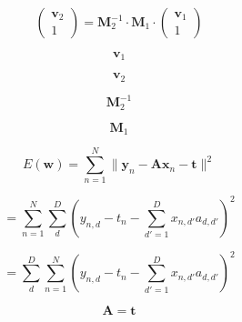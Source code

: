 \documentclass[10pt,twoside]{book}
\newcommand{\fat}[1]{\mathbf{#1}} %
\begin{document}

$$
\left(
\begin{array}{c}
\fat{v}_{2} \\
1 
\end{array}
\right)
=
\fat{M}_{2}^{-1}
\cdot
\fat{M}_{1}
\cdot
\left(
\begin{array}{c}
\fat{v}_{1} \\
1 
\end{array}
\right)
$$

$$
\fat{v}_1
$$

$$
\fat{v}_2
$$

$$
\fat{M}_{2}^{-1}
$$

$$
\fat{M}_{1}
$$


$$
E(\fat{w}) 
=
\sum_{n=1}^N \| \fat{y}_n - \fat{A} \fat{x}_n - \fat{t} \|^2
$$


$$
=
\sum_{n=1}^N \sum_{d}^D ( y_{n,d} - t_n - \sum_{d'=1}^D x_{n,d'} a_{d,d'} )^2
$$

$$
=
\sum_{d}^D \sum_{n=1}^N ( y_{n,d} - t_n - \sum_{d'=1}^D x_{n,d'} a_{d,d'} )^2
$$


$$
\fat{A} = \fat{t}
$$
\end{document}
